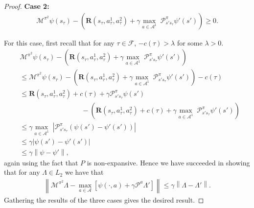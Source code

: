 \documentclass[12pt]{article}
\newtheorem{proof}{Proof}
\begin{document}
\begin{proof}
\textbf{Case 2: }
\begin{align*}\mathcal{M}^{\pi^2}\psi(s_{\tau})-\left(\boldsymbol{R}(s_\tau,a^1_\tau,a^2_\tau)+\gamma\underset{a\in\mathcal{A}^1}{\max}\;\mathcal{P}^\pi_{s's_\tau}\psi'(s')\right)\geq 0.
\end{align*}

For this case, first recall that for any $\tau\in\mathcal{F}$, $-c(\tau)>\lambda$ for some $\lambda >0$.
% 
\begin{align*}
&\mathcal{M}^{\pi^2}\psi(s_{\tau})-\left(\boldsymbol{R}(s_\tau,a^1_\tau,a^2_\tau)+\gamma\underset{a\in\mathcal{A}^1}{\max}\;\mathcal{P}^\pi_{s's_\tau}\psi'(s')\right)
\\&\leq \mathcal{M}^{\pi^2}\psi(s_{\tau})-\left(\boldsymbol{R}(s_\tau,a^1_\tau,a^2_\tau)+\gamma\underset{a\in\mathcal{A}^1}{\max}\;\mathcal{P}^\pi_{s's_\tau}\psi'(s')\right)-c(\tau)
\\&\leq \boldsymbol{R}(s_\tau,a^1_\tau,a^2_\tau)+c(\tau)+\gamma\mathcal{P}^\pi_{s's_\tau}\psi(s')
\\&\qquad\qquad\qquad\qquad\quad-\left(\boldsymbol{R}(s_\tau,a^1_\tau,a^2_\tau)+c(\tau)+\gamma\underset{a\in\mathcal{A}^1}{\max}\;\mathcal{P}^\pi_{s's_\tau}\psi'(s')\right)
\\&\leq \gamma\underset{a\in\mathcal{A}^1}{\max}\;\left|\mathcal{P}^\pi_{s's_\tau}\left(\psi(s')-\psi'(s')\right)\right|
\\&\leq \gamma\left|\psi(s')-\psi'(s')\right|
\\&\leq \gamma\left\|\psi-\psi'\right\|,
\end{align*}
again using the fact that $P$ is non-expansive. Hence we have succeeded in showing that for any $\Lambda\in L_2$ we have that
\begin{align}
    \left\|\mathcal{M}^{\pi^2}\Lambda-\underset{a\in\mathcal{A}}{\max}\left[ \psi(\cdot,a)+\gamma\mathcal{P}^a\Lambda'\right]\right\|\leq \gamma\left\|\Lambda-\Lambda'\right\|.\label{off_M_bound_gen}
\end{align}
Gathering the results of the three cases gives the desired result. 
\end{proof}
\end{document}
